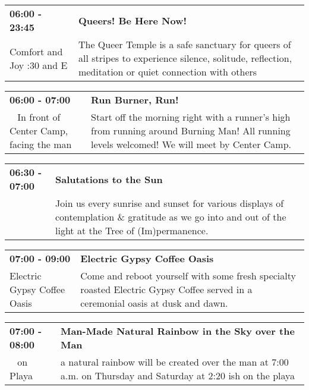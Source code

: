 \begin{tabular}{ p{1in} p{2.2in} }
    \textbf{06:00 - 23:45} & \textbf{Queers! Be Here Now!} \\
    Comfort and Joy \newline 7:30 and E & The Queer Temple is a safe sanctuary for queers of all stripes to experience silence, solitude, reflection, meditation or quiet connection with others \\
    \hline 
\end{tabular}
    
\begin{tabular}{ p{1in} p{2.2in} }
    \textbf{06:00 - 07:00} & \textbf{Run Burner, Run!} \\
    ~ \newline In front of Center Camp, facing the man & Start off the morning right with a runner's high from running around Burning Man! All running levels welcomed! We will meet by Center Camp. \\
    \hline 
\end{tabular}
    
\begin{tabular}{ p{1in} p{2.2in} }
    \textbf{06:30 - 07:00} & \textbf{Salutations to the Sun} \\
    ~ \newline  & Join us every sunrise and sunset for various displays of contemplation \& gratitude as we go into and out of the light at the Tree of (Im)permanence. \\
    \hline 
\end{tabular}
    
\begin{tabular}{ p{1in} p{2.2in} }
    \textbf{07:00 - 09:00} & \textbf{Electric Gypsy Coffee Oasis} \\
    Electric Gypsy Coffee Oasis \newline  & Come and reboot yourself with some fresh specialty roasted Electric Gypsy Coffee served in a ceremonial oasis at dusk and dawn. \\
    \hline 
\end{tabular}
    
\begin{tabular}{ p{1in} p{2.2in} }
    \textbf{07:00 - 08:00} & \textbf{Man-Made Natural Rainbow in the Sky  over the Man} \\
    ~ \newline on Playa & a natural rainbow will be created over the man at 7:00 a.m. on Thursday and Saturday at 2:20 ish on the playa \\
    \hline 
\end{tabular}
    
